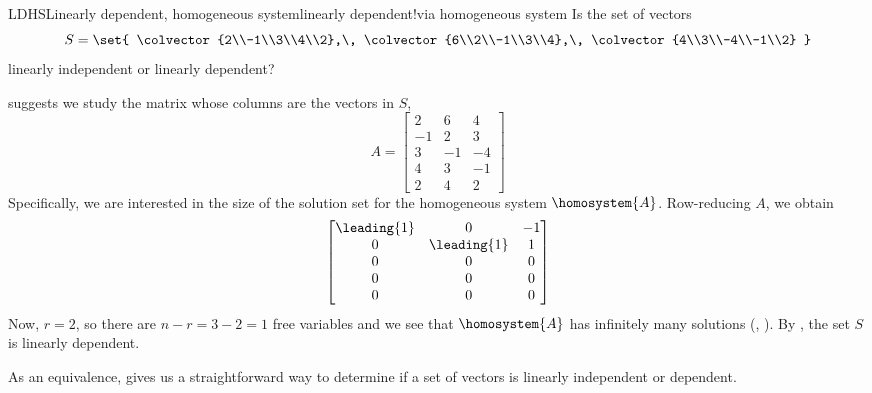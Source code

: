 %
%
\begin{example}{LDHS}{Linearly dependent, homogeneous system}{linearly dependent!via homogeneous system}
Is the set of vectors
%
\begin{equation*}
S=\set{
\colvector{2\\-1\\3\\4\\2},\,
\colvector{6\\2\\-1\\3\\4},\,
\colvector{4\\3\\-4\\-1\\2}
}
\end{equation*}
%
linearly independent or linearly dependent?\par
%
 suggests we study the matrix whose columns are the vectors in $S$,
%
\begin{equation*}
A=
\begin{bmatrix}
2 & 6 & 4\\
-1 & 2 & 3\\
3 & -1 & -4\\
4 & 3 & -1\\
2 & 4 & 2
\end{bmatrix}
\end{equation*}
%
Specifically, we are interested in the size of the solution set for the homogeneous system $\homosystem{A}$.  Row-reducing $A$, we obtain
%
\begin{equation*}
\begin{bmatrix}
\leading{1} & 0 & -1\\
0 & \leading{1} & 1\\
0 & 0 & 0\\
0 & 0 & 0\\
0 & 0 & 0
\end{bmatrix}
\end{equation*}
%
Now, $r=2$, so there are $n-r=3-2=1$ free variables and we see that $\homosystem{A}$ has infinitely many solutions (, ).  By , the set $S$ is linearly dependent.
%
\end{example}
%
As an equivalence,  gives us a straightforward way to determine if a set of vectors is linearly independent or dependent.

